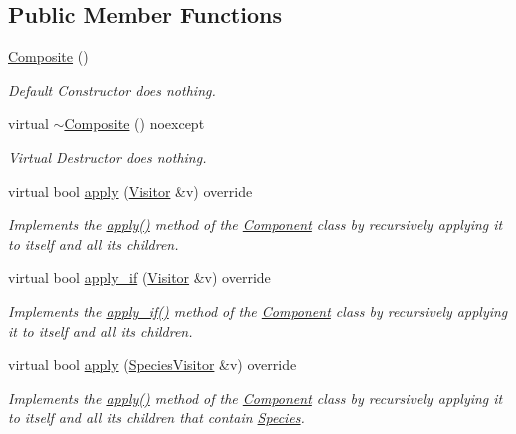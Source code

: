 \subsection*{Public Member Functions}
\begin{DoxyCompactItemize}
\item 
\hyperlink{classchem_1_1Composite_ae3444220cf51ab3db2616ea4833c4770}{Composite} ()
\begin{DoxyCompactList}\small\item\em Default Constructor does nothing. \end{DoxyCompactList}\item 
virtual \hyperlink{classchem_1_1Composite_a36a86821952d10911595120d3d26d683}{$\sim$\-Composite} () noexcept
\begin{DoxyCompactList}\small\item\em Virtual Destructor does nothing. \end{DoxyCompactList}\item 
virtual bool \hyperlink{classchem_1_1Composite_a58123ab346f6621a187bebe456e383ea}{apply} (\hyperlink{classchem_1_1Visitor}{Visitor} \&v) override
\begin{DoxyCompactList}\small\item\em Implements the \hyperlink{classchem_1_1Composite_a58123ab346f6621a187bebe456e383ea}{apply()} method of the \hyperlink{classchem_1_1Component}{Component} class by recursively applying it to itself and all its children. \end{DoxyCompactList}\item 
virtual bool \hyperlink{classchem_1_1Composite_a1cb289fb89fefeda7090a44e038e017a}{apply\-\_\-if} (\hyperlink{classchem_1_1Visitor}{Visitor} \&v) override
\begin{DoxyCompactList}\small\item\em Implements the \hyperlink{classchem_1_1Composite_a1cb289fb89fefeda7090a44e038e017a}{apply\-\_\-if()} method of the \hyperlink{classchem_1_1Component}{Component} class by recursively applying it to itself and all its children. \end{DoxyCompactList}\item 
virtual bool \hyperlink{classchem_1_1Composite_a18937a1f6f84a159e77ba83dd34b2e20}{apply} (\hyperlink{classchem_1_1SpeciesVisitor}{Species\-Visitor} \&v) override
\begin{DoxyCompactList}\small\item\em Implements the \hyperlink{classchem_1_1Composite_a58123ab346f6621a187bebe456e383ea}{apply()} method of the \hyperlink{classchem_1_1Component}{Component} class by recursively applying it to itself and all its children that contain \hyperlink{classchem_1_1Species}{Species}. \end{DoxyCompactList}\item 

\end{DoxyCompactItemize}

